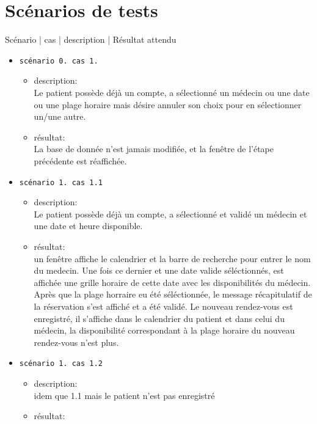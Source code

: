\documentclass[a4paper, 11pt]{report}
\begin{document}
	\section{Scénarios de tests}
	Scénario |   cas  |         description    |   Résultat attendu 

	\begin{itemize}
		\item[] \texttt{scénario 0. cas 1.} 
			\begin{itemize}
				\item description: \\
					Le patient possède déjà un compte, a sélectionné un médecin ou une date ou une
					plage horaire mais désire annuler son choix pour en sélectionner un/une autre.
				\item résultat:\\
					La base de donnée n’est jamais modifiée, et la fenêtre de l’étape précédente
					est réaffichée.\\
			\end{itemize}
		\item[] \texttt{scénario 1. cas 1.1}
			\begin{itemize}
				\item description:  \\
					Le patient possède déjà un compte, a sélectionné et validé
					un médecin et une date et heure disponible.
				\item résultat: \\
					un fenêtre affiche le calendrier et la barre de recherche
					pour entrer le nom du medecin. 
					Une fois ce dernier et une date valide séléctionnés, est
					affichée une grille horaire de cette date avec les
					disponibilités du médecin. Après que la plage horraire eu
					été séléctionnée, 
					le message récapitulatif de la réservation s’est affiché et
					a été validé. 
					Le nouveau rendez-vous est enregistré, il s’affiche dans le
					calendrier du patient et dans celui du médecin, la
					disponibilité correspondant à la plage horaire du nouveau
					rendez-vous n’est plus.\\
			\end{itemize}
		\item[] \texttt{scénario 1. cas 1.2}
			\begin{itemize}
				\item description:  \\
					idem que 1.1 mais le patient n’est pas enregistré
				\item résultat: \\

\end{itemize}
\end{itemize}
\end{document}
